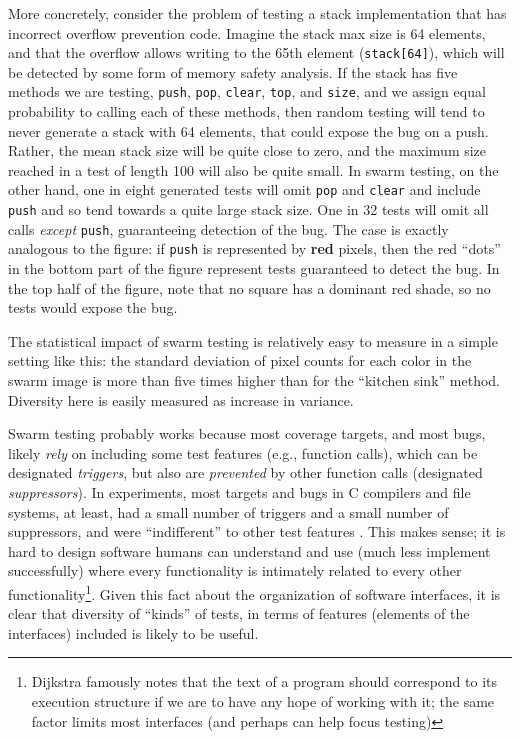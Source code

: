 \documentclass[sigplan,screen]{acmart}
\begin{document}
More concretely, consider the problem of testing a stack
implementation that has incorrect overflow prevention code.  Imagine
the stack max size is 64 elements, and that the overflow allows
writing to the 65th element ({\tt stack[64]}), which will be detected by some form of
memory safety analysis.  If the stack has five methods we are testing,
{\tt push}, {\tt pop}, {\tt clear}, {\tt top}, and {\tt size}, and we
assign equal probability to calling each of these methods, then random
testing will tend to never generate a stack with 64 elements, that
could expose the bug on a push.  Rather, the mean stack size will be
quite close to zero, and the maximum size reached in a test of length
100 will also be quite small.  In swarm testing, on the other hand,
one in eight generated tests will omit {\tt pop} and {\tt clear} and
include {\tt push} and so tend towards a quite large stack size.  One
in 32 tests will omit all calls \emph{except} {\tt push}, guaranteeing
detection of the bug.  The case is exactly analogous to the figure: if
{\tt push} is represented by {\bf red} pixels, then the red ``dots''
in the bottom part of the figure represent tests guaranteed to detect
the bug.  In the top half of the figure, note that no square has a
dominant red shade, so no tests would expose the bug.

The statistical impact of swarm testing is relatively easy to measure
in a simple setting like this: the standard deviation of pixel counts
for each color in the swarm image is more than five times higher than
for the ``kitchen sink'' method.  Diversity here is easily measured as
increase in variance.

Swarm testing probably works because most coverage targets, and most
bugs, likely \emph{rely} on including some test features (e.g.,
function calls), which can be designated \emph{triggers}, but also are
\emph{prevented} by other function calls (designated
\emph{suppressors}).  In experiments, most targets and bugs in C
compilers and file systems, at least, had a small number of triggers
and a small number of suppressors, and were ``indifferent'' to other
test features \cite{groce2013help}.  This makes sense; it is hard to
design software humans can understand and use (much less implement
successfully) where every
functionality is intimately related to every other functionality\footnote{Dijkstra famously \cite{ewd} notes that the text of a
program should correspond to its execution structure if we are to have
any hope of working with it; the same factor limits most interfaces
(and perhaps can help focus testing)}.
Given this fact about the organization of software interfaces, it is
clear that diversity of ``kinds'' of tests, in terms of features
(elements of the interfaces) included is likely to be useful.
\end{document}
